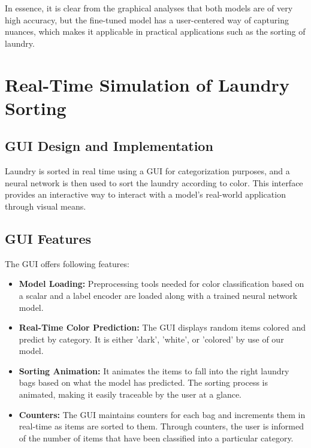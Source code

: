 \documentclass{article}
\begin{document}
In essence, it is clear from the graphical analyses that both models are of very high accuracy, but the fine-tuned model has a user-centered way of capturing nuances, which makes it applicable in practical applications such as the sorting of laundry.
\newpage


\section{Real-Time Simulation of Laundry Sorting}
\subsection{GUI Design and Implementation}
Laundry is sorted in real time using a GUI for categorization purposes, and a neural network is then used to sort the laundry according to color. This interface provides an interactive way to interact with a model's real-world application through visual means.
\subsection{GUI Features}
The GUI offers following features:
\begin{itemize}
\item \textbf{Model Loading:} Preprocessing tools needed for color classification based on a scalar and a label encoder are loaded along with a trained neural network model.
\item \textbf{Real-Time Color Prediction:} The GUI displays random items colored and predict by category. It is either 'dark', 'white', or 'colored' by use of our model.
\item \textbf{Sorting Animation:} It animates the items to fall into the right laundry bags based on what the model has predicted. The sorting process is animated, making it easily traceable by the user at a glance.

\item \textbf{Counters:} The GUI maintains counters for each bag and increments them in real-time as items are sorted to them. Through counters, the user is informed of the number of items that have been classified into a particular category.
\end{itemize}
\end{document}
